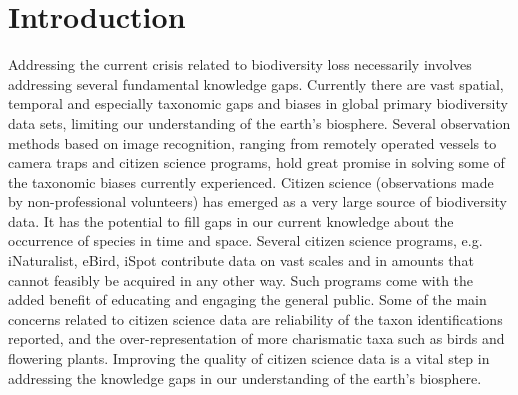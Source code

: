\documentclass{article}
\begin{document}
\section*{Introduction}
Addressing the current crisis related to biodiversity loss necessarily involves addressing several fundamental knowledge gaps\autocite{Xu2021, Pereira2013}. Currently there are vast spatial, temporal and especially taxonomic gaps and biases in global primary biodiversity data sets, limiting our understanding of the earth's biosphere\autocite{RochaOrtega2021, Beck2014,Troudet2017, GBIFtrends}. Several observation methods based on image recognition, ranging from remotely operated vessels to camera traps and citizen science programs\autocite{Bertacchi2019,Tollefson2016,August2015}, hold great promise in solving some of the taxonomic biases currently experienced\autocite{Christin2019}. Citizen science (observations made by non-professional volunteers\autocite{Silvertown2009}) has emerged as a very large source of biodiversity data. It has the potential to fill gaps in our current knowledge about the occurrence of species in time and space\autocite{Chandler2017,Theobald2015,Pocock2018}. Several citizen science programs, e.g. iNaturalist, eBird, iSpot\autocite{Chandler2017Book} contribute data on vast scales and in amounts that cannot feasibly be acquired in any other way. Such programs come with the added benefit of educating and engaging the general public\autocite{Trouille2019,Bonney2015,Schuttler2018}. Some of the main concerns related to citizen science data are reliability of the taxon identifications reported\autocite{Crall2011,Burgess2017}, and the over-representation of more charismatic taxa such as birds and flowering plants\autocite{Callaghan2020,Bayraktarov2019,Boakes2016}. Improving the quality of citizen science data is a vital step in addressing the knowledge gaps in our understanding of the earth's biosphere.
\end{document}
